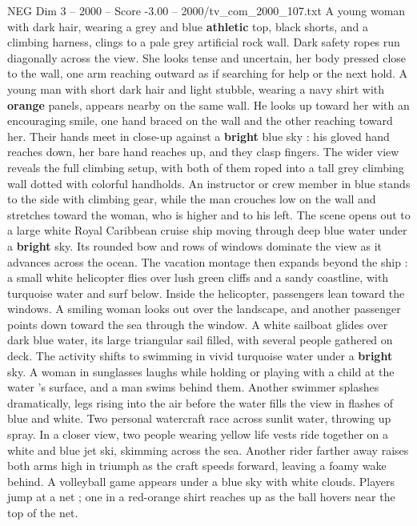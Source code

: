 \begin{textsample}{NEG Dim 3 – 2000 – Score -3.00 – 2000/tv\_com\_2000\_107.txt}  \label{ex:f3_neg_033}
A young woman with dark hair, wearing a grey and blue \textbf{athletic} top, black shorts, and a climbing harness, clings to a pale grey artificial rock wall.
Dark safety ropes run diagonally across the view.
She looks tense and uncertain, her body pressed close to the wall, one arm reaching outward as if searching for help or the next hold.
A young man with short dark hair and light stubble, wearing a navy shirt with \textbf{orange} panels, appears nearby on the same wall.
He looks up toward her with an encouraging smile, one hand braced on the wall and the other reaching toward her.
Their hands meet in close-up against a \textbf{bright} blue sky : his gloved hand reaches down, her bare hand reaches up, and they clasp fingers.
The wider view reveals the full climbing setup, with both of them roped into a tall grey climbing wall dotted with colorful handholds.
An instructor or crew member in blue stands to the side with climbing gear, while the man crouches low on the wall and stretches toward the woman, who is higher and to his left.
The scene opens out to a large white Royal Caribbean cruise ship moving through deep blue water under a \textbf{bright} sky.
Its rounded bow and rows of windows dominate the view as it advances across the ocean.
The vacation montage then expands beyond the ship : a small white helicopter flies over lush green cliffs and a sandy coastline, with turquoise water and surf below.
Inside the helicopter, passengers lean toward the windows.
A smiling woman looks out over the landscape, and another passenger points down toward the sea through the window.
A white sailboat glides over dark blue water, its large triangular sail filled, with several people gathered on deck.
The activity shifts to swimming in vivid turquoise water under a \textbf{bright} sky.
A woman in sunglasses laughs while holding or playing with a child at the water ’s surface, and a man swims behind them.
Another swimmer splashes dramatically, legs rising into the air before the water fills the view in flashes of blue and white.
Two personal watercraft race across sunlit water, throwing up spray.
In a closer view, two people wearing yellow life vests ride together on a white and blue jet ski, skimming across the sea.
Another rider farther away raises both arms high in triumph as the craft speeds forward, leaving a foamy wake behind.
A volleyball game appears under a blue sky with white clouds.
Players jump at a net ; one in a red-orange shirt reaches up as the ball hovers near the top of the net.

\end{textsample}
